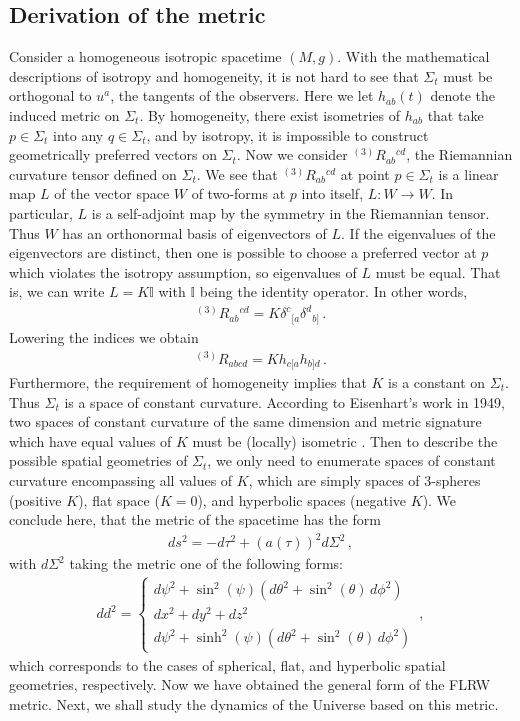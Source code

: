 \documentclass[11pt]{article}
\theoremstyle{break}
\theoremstyle{break}
\begin{document}
\subsection{Derivation of the metric}
Consider a homogeneous isotropic spacetime $(M,g)$. With the mathematical descriptions of isotropy and homogeneity, it is not hard to see that $\Sigma_t$ must be orthogonal to $u^a$, the tangents of the observers. Here we let $h_{ab}(t)$ denote the induced metric on $\Sigma_t$. By homogeneity, there exist isometries of $h_{ab}$ that take $p \in \Sigma_t$ into any $q \in \Sigma_t$, and by isotropy, it is impossible to construct geometrically preferred vectors on $\Sigma_t$. Now we consider ${}^{(3)}R_{ab}{}^{cd}$, the Riemannian curvature tensor defined on $\Sigma_t$. We see that ${}^{(3)}R_{ab}{}^{cd}$ at point $p\in \Sigma_t$ is a linear map $L$ of the vector space $W$ of two-forms at $p$ into itself, $L:W\to W$. In particular, $L$ is a self-adjoint map by the symmetry in the Riemannian tensor. Thus $W$ has an orthonormal basis of eigenvectors of $L$. If the eigenvalues of the eigenvectors are distinct, then one is possible to choose a preferred vector at $p$ which violates the isotropy assumption, so eigenvalues of $L$ must be equal. That is, we can write $L = K\mathbb{I}$ with $\mathbb{I}$ being the identity operator. In other words,
\begin{align}
{}^{(3)}R_{ab}{}^{cd} = K \delta^c {}_{[a} \delta^d{}_{b]}\,.
\end{align}
Lowering the indices we obtain
\begin{align}
{}^{(3)}R_{abcd} = K h_{c[a}h_{b]d}\,.
\end{align}
Furthermore, the requirement of homogeneity implies that $K$ is a constant on $\Sigma_t$. Thus $\Sigma_t$ is a space of constant curvature. According to Eisenhart's work in 1949, two spaces of constant curvature of the same dimension and metric signature which have equal values of $K$ must be (locally) isometric \cite{Wald}. Then to describe the possible spatial geometries of $\Sigma_t$, we only need to enumerate spaces of constant curvature encompassing all values of $K$, which are simply spaces of $3$-spheres (positive $K$), flat space ($K=0$), and hyperbolic spaces (negative $K$). We conclude here, that the metric of the spacetime has the form
\begin{align}
ds^2 = -d\tau^2 + (a(\tau))^2 d\Sigma^2\,,
\end{align}
with $d\Sigma^2$ taking the metric one of the following forms:
\begin{align}
dd^2 = 
\begin{cases}
d\psi^2 + \sin^2(\psi)(d\theta^2 + \sin^2(\theta)\, d\phi^2)\\
dx^2 + dy^2 + dz^2 \\ 
d\psi^2 + \sinh^2(\psi)(d\theta^2 + \sin^2(\theta) \, d\phi^2)
\end{cases}\,,
\end{align}
which corresponds to the cases of spherical, flat, and hyperbolic spatial geometries, respectively. Now we have obtained the general form of the FLRW metric. Next, we shall study the dynamics of the Universe based on this metric. 
\end{document}
